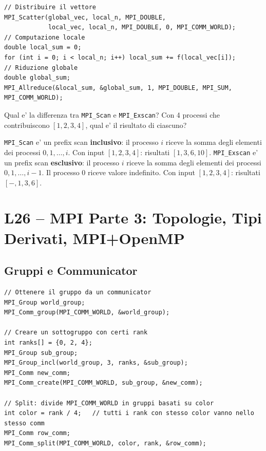 \documentclass[11pt,a4paper]{article}
\theoremstyle{remark}
\newenvironment{esercizio}[1][]{%
  \begin{tcolorbox}[breakable,title={\textbf{Esercizio / Domanda d'esame}\ifx&#1&\else: #1\fi},
    colback=yellow!5!white, colframe=orange!75!black, fonttitle=\small\bfseries]%
}{%
  \end{tcolorbox}%
}
\newenvironment{risposta}{%
  \begin{tcolorbox}[breakable,title={\textbf{Risposta}},
    colback=green!5!white, colframe=green!50!black, fonttitle=\small\bfseries]%
}{%
  \end{tcolorbox}%
}
\begin{document}
\begin{lstlisting}[style=cpp]
// Distribuire il vettore
MPI_Scatter(global_vec, local_n, MPI_DOUBLE,
            local_vec, local_n, MPI_DOUBLE, 0, MPI_COMM_WORLD);
// Computazione locale
double local_sum = 0;
for (int i = 0; i < local_n; i++) local_sum += f(local_vec[i]);
// Riduzione globale
double global_sum;
MPI_Allreduce(&local_sum, &global_sum, 1, MPI_DOUBLE, MPI_SUM, MPI_COMM_WORLD);
\end{lstlisting}

\begin{esercizio}
Qual e' la differenza tra \lstinline|MPI_Scan| e \lstinline|MPI_Exscan|? Con 4 processi che contribuiscono $[1,2,3,4]$, qual e' il risultato di ciascuno?
\end{esercizio}
\begin{risposta}
\lstinline|MPI_Scan| e' un prefix scan \textbf{inclusivo}: il processo $i$ riceve la somma degli elementi dei processi $0, 1, \ldots, i$. Con input $[1,2,3,4]$: risultati $[1, 3, 6, 10]$.
\lstinline|MPI_Exscan| e' un prefix scan \textbf{esclusivo}: il processo $i$ riceve la somma degli elementi dei processi $0, 1, \ldots, i-1$. Il processo 0 riceve valore indefinito. Con input $[1,2,3,4]$: risultati $[-, 1, 3, 6]$.
\end{risposta}

\section{L26 -- MPI Parte 3: Topologie, Tipi Derivati, MPI+OpenMP}

\subsection{Gruppi e Communicator}

\begin{lstlisting}[style=cpp]
// Ottenere il gruppo da un communicator
MPI_Group world_group;
MPI_Comm_group(MPI_COMM_WORLD, &world_group);

// Creare un sottogruppo con certi rank
int ranks[] = {0, 2, 4};
MPI_Group sub_group;
MPI_Group_incl(world_group, 3, ranks, &sub_group);
MPI_Comm new_comm;
MPI_Comm_create(MPI_COMM_WORLD, sub_group, &new_comm);

// Split: divide MPI_COMM_WORLD in gruppi basati su color
int color = rank / 4;   // tutti i rank con stesso color vanno nello stesso comm
MPI_Comm row_comm;
MPI_Comm_split(MPI_COMM_WORLD, color, rank, &row_comm);
\end{lstlisting}
\end{document}
